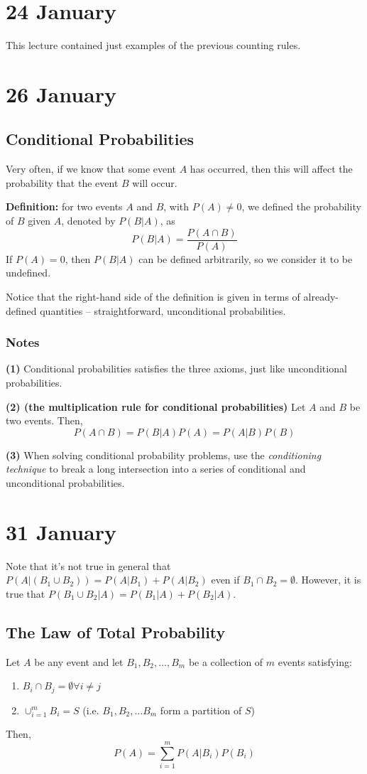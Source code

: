 \documentclass[12pt]{article}
\begin{document}
\section{24 January}
This lecture contained just examples of the previous counting rules.

\section{26 January}
\subsection{Conditional Probabilities}
Very often, if we know that some event $A$ has occurred, then this will affect the probability that the event $B$ will occur.

\textbf{Definition:} for two events $A$ and $B$, with $P(A) \neq 0$, we defined the probability of $B$ given $A$, denoted by $P(B|A)$, as
\[
	P(B|A) = \frac{P(A \cap B)}{P(A)}
\]
If $P(A) = 0$, then $P(B|A)$ can be defined arbitrarily, so we consider it to be undefined.

Notice that the right-hand side of the definition is given in terms of already-defined quantities -- straightforward, unconditional probabilities. 

\subsubsection{Notes}
\textbf{(1)} Conditional probabilities satisfies the three axioms, just like unconditional probabilities.

\textbf{(2) (the multiplication rule for conditional probabilities)} Let $A$ and $B$ be two events. Then,
\[
	P(A \cap B) = P(B|A) P(A) = P(A|B) P(B)
\]

\textbf{(3)} When solving conditional probability problems, use the \emph{conditioning technique} to break a long intersection into a series of conditional and unconditional probabilities.

\section{31 January} 
Note that it's not true in general that $P(A | (B_1 \cup B_2)) = P(A | B_1) + P(A | B_2)$ even if $B_1 \cap B_2 = \emptyset$. However, it is true that $P(B_1 \cup B_2 | A) = P(B_1 | A) + P(B_2 | A)$.

\subsection{The Law of Total Probability}
Let $A$ be any event and let $B_1, B_2, \dots, B_m$ be a collection of $m$ events satisfying:
\begin{enumerate}
	\item $B_i \cap B_j = \emptyset \forall i \neq j$
	\item $\cup_{i=1}^{m} B_i = S$ (i.e. $B_1, B_2, \dots B_m$ form a partition of $S$)
\end{enumerate}
Then,
\[
	P(A) = \sum_{i=1}^{m} P(A | B_i) P(B_i)
\]
\end{document}
